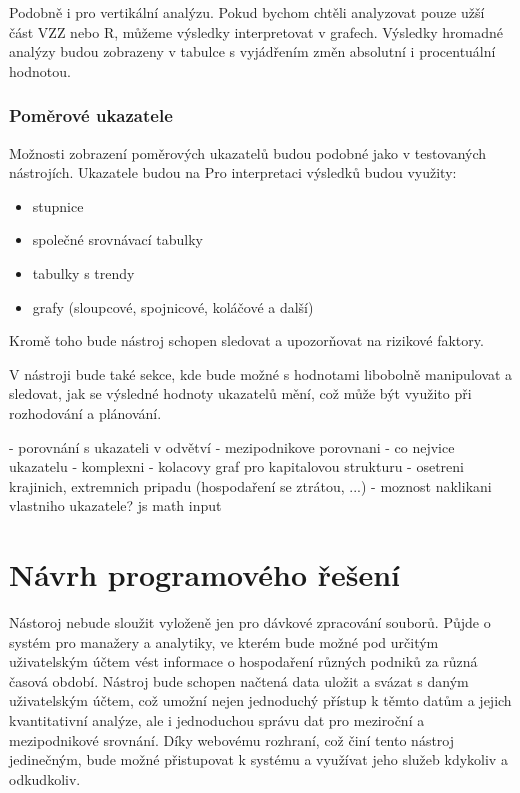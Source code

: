 Podobně i pro vertikální analýzu. Pokud bychom chtěli analyzovat pouze užší část VZZ nebo R, můžeme výsledky interpretovat v grafech. Výsledky hromadné analýzy budou zobrazeny v tabulce s vyjádřením změn absolutní i procentuální hodnotou.

\subsubsection{Poměrové ukazatele}
Možnosti zobrazení poměrových ukazatelů budou podobné jako v testovaných nástrojích. Ukazatele budou na
Pro interpretaci výsledků budou využity:
\begin{itemize}
	\item stupnice
	\item společné srovnávací tabulky
	\item tabulky s trendy
	\item grafy (sloupcové, spojnicové, koláčové a další)
\end{itemize}

Kromě toho bude nástroj schopen sledovat a upozorňovat na rizikové faktory.

V nástroji bude také sekce, kde bude možné s hodnotami libobolně manipulovat a sledovat, jak se výsledné hodnoty ukazatelů mění, což může být využito při rozhodování a plánování.

- porovnání s ukazateli v odvětví
- mezipodnikove porovnani
- co nejvice ukazatelu - komplexni
- kolacovy graf pro kapitalovou strukturu
- osetreni krajinich, extremnich pripadu (hospodaření se ztrátou, ...)
- moznost naklikani vlastniho ukazatele? js math input



\section{Návrh programového řešení}

Nástoroj nebude sloužit vyloženě jen pro dávkové zpracování souborů. Půjde o systém pro manažery a analytiky, ve kterém bude možné pod určitým uživatelským účtem vést informace o hospodaření různých podniků za různá časová období. Nástroj bude schopen načtená data uložit a svázat s daným uživatelským účtem, což umožní nejen jednoduchý přístup k těmto datům a jejich kvantitativní analýze, ale i jednoduchou správu dat pro meziroční a mezipodnikové srovnání. Díky webovému rozhraní, což činí tento nástroj jedinečným, bude možné přistupovat k systému a využívat jeho služeb kdykoliv a odkudkoliv.

